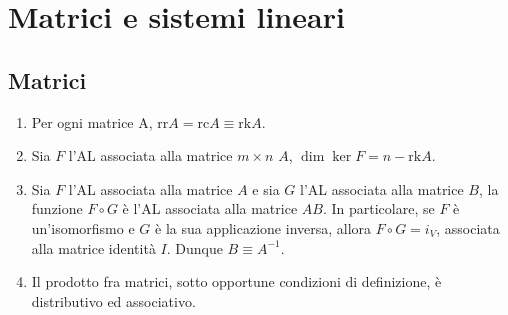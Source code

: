 \documentclass[draft]{article}
\begin{document}
\section{Matrici e sistemi lineari}
\subsection{Matrici}
\begin{enumerate}

\item Per ogni matrice A, $\mathrm{rr} A= \mathrm{rc} A \equiv \mathrm{rk} A$.

\item Sia $F$ l'AL associata alla matrice $m \times n$ $A$, $\dim \ker F = n - \mathrm{rk} A$.

\item Sia $F$ l'AL associata alla matrice $A$ e sia $G$ l'AL associata alla matrice $B$, la funzione $F \circ G$ è l'AL associata alla matrice $AB$. In particolare, se $F$ è un'isomorfismo e $G$ è la sua applicazione inversa, allora $F \circ G = i_{V}$, associata alla matrice identità $I$. Dunque $B \equiv A^{-1}$.

\item Il prodotto fra matrici, sotto opportune condizioni di definizione, è distributivo ed associativo. 
\end{enumerate}
\end{document}
